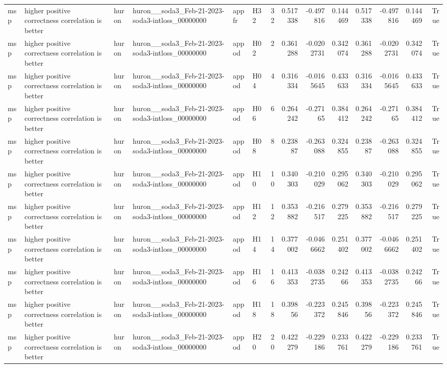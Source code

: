 \begin{longtable}{llllllrrrrrrrr}
msp & higher positive correctness correlation is better & huron & huron\_\_soda3\_Feb-21-2023-soda3-intloss\_00000000 & appfr & H32 & 32 & 0.517338 & -0.497816 & 0.144469 & 0.517338 & -0.497816 & 0.144469 & True \\
msp & higher positive correctness correlation is better & huron & huron\_\_soda3\_Feb-21-2023-soda3-intloss\_00000000 & appod & H02 & 2 & 0.361288 & -0.0202731 & 0.342074 & 0.361288 & -0.0202731 & 0.342074 & True \\
msp & higher positive correctness correlation is better & huron & huron\_\_soda3\_Feb-21-2023-soda3-intloss\_00000000 & appod & H04 & 4 & 0.316334 & -0.0165645 & 0.433633 & 0.316334 & -0.0165645 & 0.433633 & True \\
msp & higher positive correctness correlation is better & huron & huron\_\_soda3\_Feb-21-2023-soda3-intloss\_00000000 & appod & H06 & 6 & 0.264242 & -0.27165 & 0.384412 & 0.264242 & -0.27165 & 0.384412 & True \\
msp & higher positive correctness correlation is better & huron & huron\_\_soda3\_Feb-21-2023-soda3-intloss\_00000000 & appod & H08 & 8 & 0.23887 & -0.263088 & 0.324855 & 0.23887 & -0.263088 & 0.324855 & True \\
msp & higher positive correctness correlation is better & huron & huron\_\_soda3\_Feb-21-2023-soda3-intloss\_00000000 & appod & H10 & 10 & 0.340303 & -0.210029 & 0.295062 & 0.340303 & -0.210029 & 0.295062 & True \\
msp & higher positive correctness correlation is better & huron & huron\_\_soda3\_Feb-21-2023-soda3-intloss\_00000000 & appod & H12 & 12 & 0.353882 & -0.216517 & 0.279225 & 0.353882 & -0.216517 & 0.279225 & True \\
msp & higher positive correctness correlation is better & huron & huron\_\_soda3\_Feb-21-2023-soda3-intloss\_00000000 & appod & H14 & 14 & 0.377002 & -0.0466662 & 0.251402 & 0.377002 & -0.0466662 & 0.251402 & True \\
msp & higher positive correctness correlation is better & huron & huron\_\_soda3\_Feb-21-2023-soda3-intloss\_00000000 & appod & H16 & 16 & 0.413353 & -0.0382735 & 0.24266 & 0.413353 & -0.0382735 & 0.24266 & True \\
msp & higher positive correctness correlation is better & huron & huron\_\_soda3\_Feb-21-2023-soda3-intloss\_00000000 & appod & H18 & 18 & 0.39856 & -0.223372 & 0.245846 & 0.39856 & -0.223372 & 0.245846 & True \\
msp & higher positive correctness correlation is better & huron & huron\_\_soda3\_Feb-21-2023-soda3-intloss\_00000000 & appod & H20 & 20 & 0.422279 & -0.229186 & 0.233761 & 0.422279 & -0.229186 & 0.233761 & True \\

\end{longtable}
